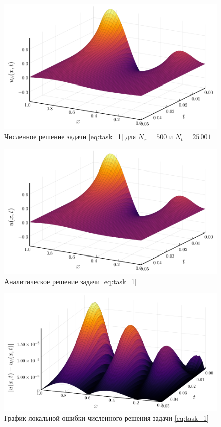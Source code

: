 \begin{figure}
    \centering
    \includegraphics{Разностные_схемы_на_статических_сетках/Программный_код_примеры_расчётов/explicit_scheme/problem_1_explicit_surface.pdf}
    \caption{Численное решение задачи \eqref{eq:task_1} для $N_x = 500$ и $N_t = 25\,001$}
    \label{fig:problem_1_explicit_surface}
\end{figure}
\begin{figure}
    \centering
    \includegraphics{Разностные_схемы_на_статических_сетках/Программный_код_примеры_расчётов/explicit_scheme/problem_1_analytic_surface.pdf}
    \caption{Аналитическое решение задачи \eqref{eq:task_1}}
    \label{fig:problem_1_analytic_surface}
\end{figure}
\begin{figure}
    \centering
    \includegraphics{Разностные_схемы_на_статических_сетках/Программный_код_примеры_расчётов/explicit_scheme/problem_1_explicit_error_surface.pdf}
    \caption{График локальной ошибки численного решения задачи \eqref{eq:task_1}}
    \label{fig:problem_1_explicit_error_surface}
\end{figure}

